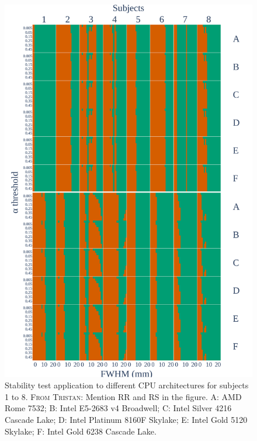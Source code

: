 \documentclass[lettersize,journal]{IEEEtran}
\newcommand{\TG}[1]{\color{blue}\textsc{From Tristan:} #1\color{black}\xspace}
\begin{document}
\begin{figure}
    \centering
    \includegraphics[width=\linewidth]{figures/arch/arch_fwe_bonferroni.pdf}
    \caption{Stability test application to different CPU architectures for subjects 1 to 8. \TG{Mention RR and RS in the figure.} A: AMD Rome 7532; B: Intel E5-2683 v4 Broadwell; C: Intel Silver 4216 Cascade Lake; D: Intel Platinum 8160F Skylake; E: Intel Gold 5120 Skylake; F: Intel Gold 6238 Cascade Lake.}
    \label{fig:arch_bonferroni}
\end{figure}
\end{document}
